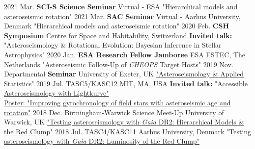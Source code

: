 \documentclass[letterpaper]{k-cv} %
\begin{document}
\begin{entrylist}
\entry
{2021 Mar.}
{\textbf{SCI-S Science \textcolor{c1}{Seminar}}}
{Virtual - ESA}
{"Hierarchical models and asteroseismic rotation"}
\entry
{2021 Mar.}
{\textbf{SAC \textcolor{c1}{Seminar}}}
{Virtual - Aarhus University, Denmark}
{"Hierarchical models and asteroseismic rotation"}
\entry
{2020 Feb.}
{\textbf{CSH Symposium}}
{Centre for Space and Habitability, Switzerland}
{\textbf{\textcolor{c1}{Invited talk:}} "Asteroseismology \& Rotational Evolution: Bayesian Inference in Stellar Astrophysics"}
\entry
{2020 Jan.}
{\textbf{ESA Research Fellow Jamboree}}
{ESA ESTEC, The Netherlands}
{"Asteroseismic Follow-Up of \textit{CHEOPS} Target Hosts"}
\entry
{2019 Nov.}
{Departmental \textbf{\textcolor{c1}{Seminar}}}
{University of Exeter, UK}
{\href{https://speakerdeck.com/ojhall94/seminar-asteroseismology-and-applied-statistics}{"Asteroseismology \& Applied Statistics"}}
\entry
{2019 Jul.}
{TASC5/KASC12}
{MIT, MA, USA}
{\textbf{\textcolor{c1}{Invited talk:}} \href{https://speakerdeck.com/ojhall94/accessible-asteroseismology-with-lightkurve}{"Accessible Asteroseismology with Lightkurve"\\ \small{Poster: "Improving gyrochronology of field stars with asteroseismic age and rotation"}}}
\entry
{2018 Dec.}
{Birmingham-Warwick Science 
	Meet-Up}
{University of Warwick, UK}
{\href{https://speakerdeck.com/ojhall94/testing-asteroseismology-with-gaia-dr2-hierarchical-models-and-the-red-clump}{"Testing asteroseismology with \textit{Gaia} DR2: Hierarchical Models \& the Red Clump"}}
\entry
{2018 Jul.}
{TASC4/KASC11}
{Aarhus University, Denmark}
{\href{https://speakerdeck.com/ojhall94/testing-asteroseismology-with-gaia-dr2-luminosity-of-the-red-clump}{"Testing asteroseismology with \textit{Gaia} DR2: Luminosity of the Red Clump"}}
\end{entrylist}
\end{document}
